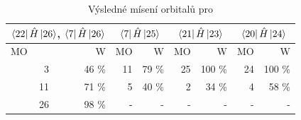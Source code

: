 \documentclass[
  digital, %
  table,   %
  lof,     %
  lot,     %
]{fithesis3}
\begin{document}
\begin{figure}
\begin{center}
\label{obr_h4sio4_vysledky_I}
\end{center}
\end{figure}


  
\begin{table}[htbp]
\caption{Výsledné mísení orbitalů pro }
\begin{center}
\begin{tabular}{|r|r|r|r|r|r|r|r|}
\hline
\multicolumn{2}{|c|}{$\bra{22}{\hat{H}}\ket{26}$, $\bra{7}{\hat{H}}\ket{26}$} & \multicolumn{2}{|c|}{$\bra{7}{\hat{H}}\ket{25}$}& \multicolumn{2}{|c|}{$\bra{21}{\hat{H}}\ket{23}$} &\multicolumn{2}{|c|}{$\bra{20}{\hat{H}}\ket{24}$} \\
\hline
\hline
\multicolumn{1}{|l|}{MO} & \multicolumn{1}{r|}{W} & \multicolumn{1}{l|}{MO} & \multicolumn{1}{r|}{W} & MO & \multicolumn{1}{r|}{W}& MO & \multicolumn{1}{r|}{W} \\ \hline
3 & 46 \% & 11 & 79 \% &25 & 100 \%& 24 & 100 \% \\ \hline
11 & 71 \% & 5 & 40 \% & 2 & 34 \% &4 & 58 \% \\ \hline
26 & 98 \% & - & - &  -& - &-&- \\ \hline
\end{tabular}
\end{center}
\label{tab_sioh3ch3_vysledky}
\end{table}
\end{document}

